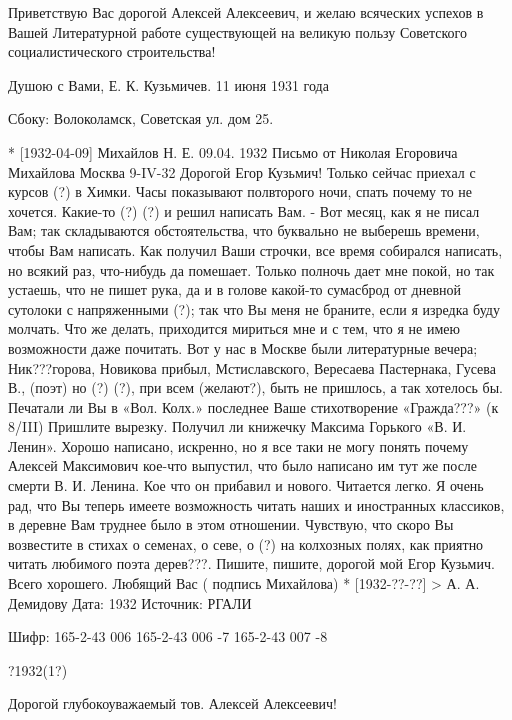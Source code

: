 \documentclass[]{memoir}
\begin{document}
Приветствую Вас дорогой Алексей Алексеевич, и желаю всяческих успехов в Вашей Литературной работе существующей на великую пользу Советского социалистического строительства!

Душою с Вами, Е. К. Кузьмичев. 11 июня 1931 года

Сбоку: Волоколамск, Советская ул. дом 25.

* [1932-04-09] Михайлов Н. Е.
09.04. 1932
Письмо от Николая Егоровича Михайлова 
Москва 9-IV-32
Дорогой Егор Кузьмич!
Только сейчас приехал с курсов (?) в Химки. Часы показывают полвторого ночи, спать почему то не хочется. Какие-то (?) (?) и решил написать Вам. - 
Вот месяц, как я не писал Вам; так складываются обстоятельства, что буквально не выберешь времени, чтобы Вам написать. Как получил Ваши строчки, все время собирался написать, но всякий раз, что-нибудь да помешает.
Только полночь дает мне покой, но так устаешь, что не пишет рука, да и в голове какой-то сумасброд от дневной сутолоки с напряженными (?); так  что Вы меня не браните, если я изредка буду молчать. 
Что же делать, приходится мириться мне и с тем, что я не имею возможности даже почитать. Вот  у нас в Москве были литературные вечера; Ник???горова, Новикова прибыл, Мстиславского, Вересаева Пастернака, Гусева В., (поэт) но (?) (?), при всем (желают?), быть не пришлось, а так хотелось бы.
Печатали ли Вы в «Вол. Колх.» последнее Ваше стихотворение «Гражда???» (к 8/III) Пришлите вырезку. Получил ли книжечку Максима Горького «В. И. Ленин». Хорошо написано, искренно, но я все таки не могу понять почему Алексей Максимович кое-что  выпустил, что было написано им тут же после смерти В. И. Ленина. Кое что он прибавил и нового. Читается легко. Я очень рад, что Вы теперь имеете возможность читать наших и иностранных классиков, в деревне Вам труднее было в этом отношении.
Чувствую, что скоро Вы возвестите в стихах о семенах, о севе, о (?) на колхозных полях, как приятно читать любимого поэта дерев???. 
Пишите, пишите, дорогой мой Егор Кузьмич.
Всего хорошего.
Любящий Вас ( подпись Михайлова)
* [1932-??-??] > А. А. Демидову 
Дата: 1932
Источник: РГАЛИ


Шифр:   165-2-43 006
        165-2-43 006 -7
        165-2-43 007 -8

?1932(1?)

                                              Дорогой глубокоуважаемый тов. Алексей Алексеевич!
\end{document}

